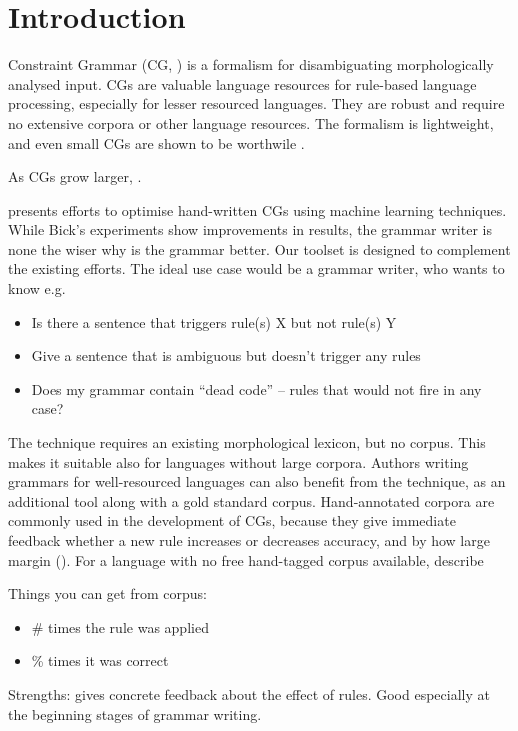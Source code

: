 \section{Introduction}
\label{sec:intro}

Constraint Grammar (CG, \cite{karlsson1995constraint})
is a formalism for disambiguating morphologically analysed input.
CGs are valuable language resources for rule-based language processing, especially for lesser resourced languages. They are robust and require no extensive corpora or other language resources. The formalism is lightweight, and even small CGs are shown to be worthwile \cite{lene_trond2011}.

As CGs grow larger, .

\cite{bick2013tuning} presents efforts to optimise hand-written CGs using machine learning techniques.
While Bick's experiments show improvements in results, the grammar writer is none the wiser why is the grammar better.
Our toolset is designed to complement the existing efforts.
The ideal use case would be a grammar writer, who wants to know e.g.

\begin{itemize}
\item Is there a sentence that triggers rule(s) X but not rule(s) Y
\item Give a sentence that is ambiguous but doesn't trigger any rules
\item Does my grammar contain ``dead code'' -- rules that would not fire in any case?
\end{itemize}

The technique requires an existing morphological lexicon, but no corpus.
This makes it suitable also for languages without large corpora.
Authors writing grammars for well-resourced languages can also benefit from the technique, as an additional tool along with a gold standard corpus. 
Hand-annotated corpora are commonly used in the development of CGs, because they give immediate feedback whether a new rule increases or decreases accuracy, and by how large margin (\cite{voutilainen2004}). For a language with no free hand-tagged corpus available, \cite{tyers_reynolds2015} describe 

Things you can get from corpus:

\begin{itemize}
\item \# times the rule was applied
\item \% times it was correct
\end{itemize}
Strengths: gives concrete feedback about the effect of rules. Good especially at the beginning stages of grammar writing.

